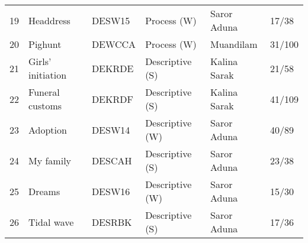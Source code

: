 \begin{tabular}{llllll}
19 & Headdress  & DESW15 & Process (W) & Saror Aduna  & 17/38 \\
20 & Pighunt  & \textsc{DEWCCA} & Process (W) & Muandilam  & 31/100 \\
21 & Girls' initiation  & \textsc{DEKRDE} & Descriptive (S) & Kalina Sarak  & 21/58 \\
22 & Funeral customs  & \textsc{DEKRDF} & Descriptive (S) & Kalina Sarak  & 41/109 \\
23 & Adoption  & DESW14 & Descriptive (W) & Saror Aduna  & 40/89 \\
24 & My family  & \textsc{DESCAH} & Descriptive (S) & Saror Aduna  & 23/38 \\
25 & Dreams  & DESW16 & Descriptive (W) & Saror Aduna  & 15/30 \\
26 & Tidal wave  & \textsc{DESRBK} & Descriptive (S) & Saror Aduna  & 17/36 \\
\end{tabular}

